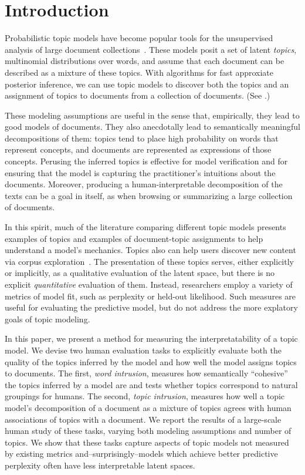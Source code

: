 \section{Introduction}
Probabilistic topic models have become popular tools for the
unsupervised analysis of large document
collections~\cite{deerwester-90,griffiths02probabilistic,blei-09}.
These models posit a set of latent \emph{topics}, multinomial
distributions over words, and assume that each document can be
described as a mixture of these topics.  With algorithms for fast
approxiate posterior inference, we can use topic models to discover
both the topics and an assignment of topics to documents from a
collection of documents.  (See .)

These modeling assumptions are useful in the sense that, empirically,
they lead to good models of documents.  They also anecdotally
lead to semantically meaningful decompositions of them: topics tend to
place high probability on words that represent concepts, and documents
are represented as expressions of those concepts.  Perusing the
inferred topics is effective for model verification and for ensuring
that the model is capturing the practitioner's intuitions about the
documents.  Moreover, producing a human-interpretable decomposition of
the texts can be a goal in itself, as when browsing or summarizing a
large collection of
documents.
\cite{Chang:2009fk}

In this spirit, much of the literature comparing different topic
models presents examples of topics and examples of document-topic
assignments to help understand a model's mechanics.  Topics also can
help users discover new content via corpus
exploration~\cite{mimno-07a}.  The presentation of these topics
serves, either explicitly or implicitly, as a qualitative evaluation
of the latent space, but there is no explicit \emph{quantitative}
evaluation of them.  Instead, researchers employ a variety of metrics
of model fit, such as perplexity or held-out likelihood.  Such
measures are useful for evaluating the predictive model, but do not
address the more explatory goals of topic modeling.

In this paper, we present a method for measuring the
interpretatability of a topic model.  We devise two human evaluation
tasks to explicitly evaluate both the quality of the topics inferred
by the model and how well the model assigns topics to documents.  The
first, \emph{word intrusion}, measures how semantically ``cohesive''
the topics inferred by a model are and tests whether topics correspond
to natural groupings for humans.  The second, \emph{topic intrusion},
measures how well a topic model's decomposition of a document as a
mixture of topics agrees with human associations of topics with a
document.  We report the results of a large-scale human study of these
tasks, varying both modeling assumptions and number of topics.  We
show that these tasks capture aspects of topic models not measured by
existing metrics and--surprisingly--models which achieve better
predictive perplexity often have less interpretable latent spaces.
